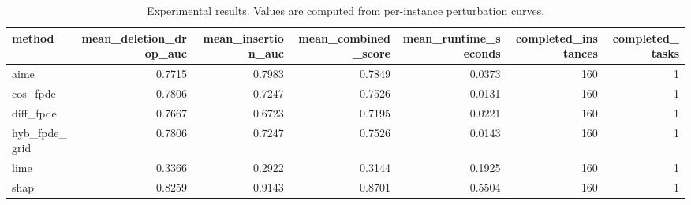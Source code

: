 \begin{table}[t]
\caption{Experimental results. Values are computed from per-instance perturbation curves.}
\label{tab:main_results_computed}
\centering
\begin{tabular}{lrrrrrr}
\toprule
method & mean\_deletion\_drop\_auc & mean\_insertion\_auc & mean\_combined\_score & mean\_runtime\_seconds & completed\_instances & completed\_tasks \\
\midrule
aime & 0.7715 & 0.7983 & 0.7849 & 0.0373 & 160 & 1 \\
cos\_fpde & 0.7806 & 0.7247 & 0.7526 & 0.0131 & 160 & 1 \\
diff\_fpde & 0.7667 & 0.6723 & 0.7195 & 0.0221 & 160 & 1 \\
hyb\_fpde\_grid & 0.7806 & 0.7247 & 0.7526 & 0.0143 & 160 & 1 \\
lime & 0.3366 & 0.2922 & 0.3144 & 0.1925 & 160 & 1 \\
shap & 0.8259 & 0.9143 & 0.8701 & 0.5504 & 160 & 1 \\
\bottomrule
\end{tabular}

\end{table}
